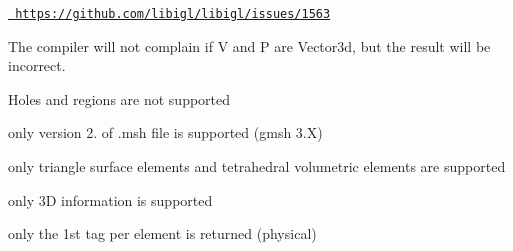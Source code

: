 \begin{DoxyRefList}
%
\href{https://github.com/libigl/libigl/issues/1563}{\texttt{ https\+://github.\+com/libigl/libigl/issues/1563}}  
\item[Member \doxylink{namespaceigl_af7eb3109db11f7024416cd77670e4bb6}{igl\+::project} (const Eigen\+::\+Matrix\+Base$<$ Derived\+V $>$ \&V, const Eigen\+::\+Matrix\+Base$<$ Derived\+M $>$ \&model, const Eigen\+::\+Matrix\+Base$<$ Derived\+N $>$ \&proj, const Eigen\+::\+Matrix\+Base$<$ Derived\+O $>$ \&viewport, Eigen\+::\+Plain\+Object\+Base$<$ Derived\+P $>$ \&P)]\label{bug__bug000016}%
%
The compiler will not complain if V and P are Vector3d, but the result will be incorrect. 
\item[Member \doxylink{namespaceigl_aa40ef4e0517c71c597272824497377b2}{igl\+::read\+MESH} (const std\+::string mesh\+\_\+file\+\_\+name, Eigen\+::\+Plain\+Object\+Base$<$ Derived\+V $>$ \&V, Eigen\+::\+Plain\+Object\+Base$<$ Derived\+T $>$ \&T, Eigen\+::\+Plain\+Object\+Base$<$ Derived\+F $>$ \&F)]\label{bug__bug000017}%
%
Holes and regions are not supported  
\item[Member \doxylink{namespaceigl_a71568db686b70c51b2b3ea414c348a86}{igl\+::read\+MSH} (const std\+::string \&msh, Eigen\+::\+Matrix\+Xd \&X, Eigen\+::\+Matrix\+Xi \&Tri, Eigen\+::\+Matrix\+Xi \&Tet, Eigen\+::\+Vector\+Xi \&Tri\+Tag, Eigen\+::\+Vector\+Xi \&Tet\+Tag, std\+::vector$<$ std\+::string $>$ \&XFields, std\+::vector$<$ Eigen\+::\+Matrix\+Xd $>$ \&XF, std\+::vector$<$ std\+::string $>$ \&EFields, std\+::vector$<$ Eigen\+::\+Matrix\+Xd $>$ \&TriF, std\+::vector$<$ Eigen\+::\+Matrix\+Xd $>$ \&TetF)]\label{bug__bug000018}%
%
only version 2. of .msh file is supported (gmsh 3.\+X) 



only triangle surface elements and tetrahedral volumetric elements are supported 



only 3D information is supported 



only the 1st tag per element is returned (physical) 




\end{DoxyRefList}
